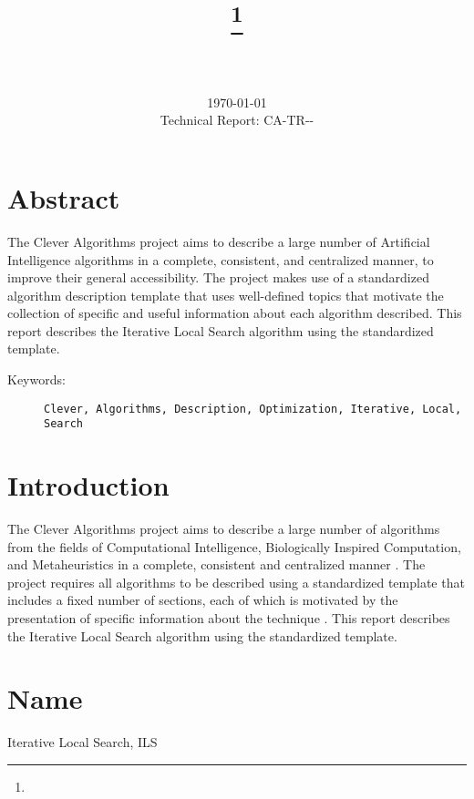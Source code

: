 \documentclass[a4paper, 11pt]{article}
\title{{\myreporttitle}\footnote{\myreportlicense}}
\author{\myreportauthor\\{\myreportemail}\\\small\myreportproject}
\date{\today\\{\small{Technical Report: CA-TR-{\myreportdate}-\myreportversion}}}
\begin{document}
\maketitle

\section*{Abstract} 
The Clever Algorithms project aims to describe a large number of Artificial Intelligence algorithms in a complete, consistent, and centralized manner, to improve their general accessibility. 
The project makes use of a standardized algorithm description template that uses well-defined topics that motivate the collection of specific and useful information about each algorithm described.
This report describes the Iterative Local Search algorithm using the standardized template.

\begin{description}
	\item[Keywords:] {\small\texttt{Clever, Algorithms, Description, Optimization, Iterative, Local, Search}}
\end{description} 

\section{Introduction} 
\label{sec:intro}
The Clever Algorithms project aims to describe a large number of algorithms from the fields of Computational Intelligence, Biologically Inspired Computation, and Metaheuristics in a complete, consistent and centralized manner \cite{Brownlee2010}.
The project requires all algorithms to be described using a standardized template that includes a fixed number of sections, each of which is motivated by the presentation of specific information about the technique \cite{Brownlee2010a}.
This report describes the Iterative Local Search algorithm using the standardized template.

\section{Name} 
\label{sec:name}
Iterative Local Search, ILS
\end{document}
